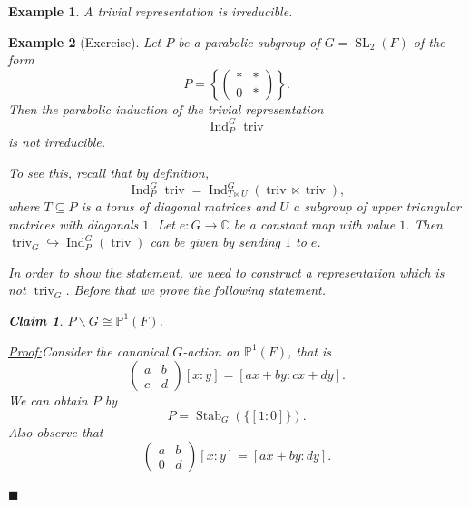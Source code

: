\documentclass[8pt]{article}
\newtheorem{claim}{Claim}
\newenvironment{claimproof}[1]{\par\noindent\underline{Proof:}\space#1}{\hfill $\blacksquare$}
\newtheorem{example}{Example}[section]
\DeclareMathOperator{\triv}{triv}
\DeclareMathOperator{\Stab}{Stab}
\DeclareMathOperator{\Ind}{Ind}
\DeclareMathOperator{\SL}{SL}
\newcommand{\C}[0]{\mathbb{C}}
\newcommand{\Para}[0]{\mathbb{P}}
\begin{document}
\begin{example}
A trivial representation is irreducible.
\end{example}

\begin{example}[Exercise]
Let $P$ be a parabolic subgroup of $G=\SL_2(F)$ of the form
\begin{equation*}
P = \left\{\begin{pmatrix} \ast &\ast\\ 0 &\ast\end{pmatrix}\right\}.
\end{equation*}
Then the parabolic induction of the trivial representation 
\begin{equation*}
\Ind_P^{G}\triv
\end{equation*}
is not irreducible.
\par To see this, recall that by definition,
\begin{equation*}
  \Ind_P^{G}\triv = \Ind_{T\ltimes U}^G(\triv\ltimes \triv),
\end{equation*}
where $T\subseteq P$ is a torus of diagonal matrices and $U$ a subgroup of upper triangular matrices with diagonals $1$.
Let $e:G\to \C$ be a constant map with value $1$. Then $\triv_G\hookrightarrow\Ind_P^G(\triv)$ can be given by sending $1$ to $e$.
\par In order to show the statement, we need to construct a representation which is not $\triv_G$. Before that we prove the following statement.
\begin{claim}
  $P\backslash G \cong \Para^1(F)$.
\end{claim}
\begin{claimproof}
  Consider the canonical $G$-action on $\Para^1(F)$, that is 
  \begin{equation*}
    \begin{pmatrix}
      a & b\\
      c& d
    \end{pmatrix}
    [x:y] = [ax+by:cx+dy].
  \end{equation*}
  We can obtain $P$ by 
  \begin{equation*}
    P = \Stab_G(\{[1:0]\}).
  \end{equation*}
  Also observe that 
  \begin{equation*}
    \begin{pmatrix}
      a & b\\
      0& d
    \end{pmatrix}
    [x:y] = [ax+by:dy].
  \end{equation*}

\end{claimproof}
\end{example}
\end{document}
